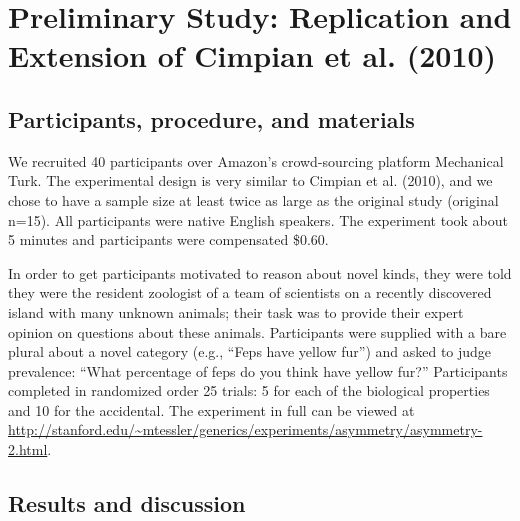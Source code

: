\documentclass[floatsintext,doc]{apa6}
\begin{document}
\hypertarget{preliminary-study-replication-and-extension-of-cimpian-et-al.-2010}{%
\section{Preliminary Study: Replication and Extension of Cimpian et al. (2010)}\label{preliminary-study-replication-and-extension-of-cimpian-et-al.-2010}}


\hypertarget{participants}{%
\subsection{Participants, procedure, and materials}\label{participants}}

We recruited 40 participants over Amazon's crowd-sourcing platform Mechanical Turk.
The experimental design is very similar to Cimpian et al. (2010), and we chose to have a sample size at least twice as large as the original study (original n=15).
All participants were native English speakers.
The experiment took about 5 minutes and participants were compensated \$0.60.


In order to get participants motivated to reason about novel kinds, they were told they were the resident zoologist of a team of scientists on a recently discovered island with many unknown animals; their task was to provide their expert opinion on questions about these animals.
Participants were supplied with a bare plural about a novel category (e.g., \enquote{Feps have yellow fur}) and asked to judge prevalence: \enquote{What percentage of feps do you think have yellow fur?}
Participants completed in randomized order 25 trials: 5 for each of the biological properties and 10 for the accidental.
The experiment in full can be viewed at \url{http://stanford.edu/~mtessler/generics/experiments/asymmetry/asymmetry-2.html}.

\hypertarget{results-and-discussion}{%
\subsection{Results and discussion}\label{results-and-discussion}}
\end{document}
